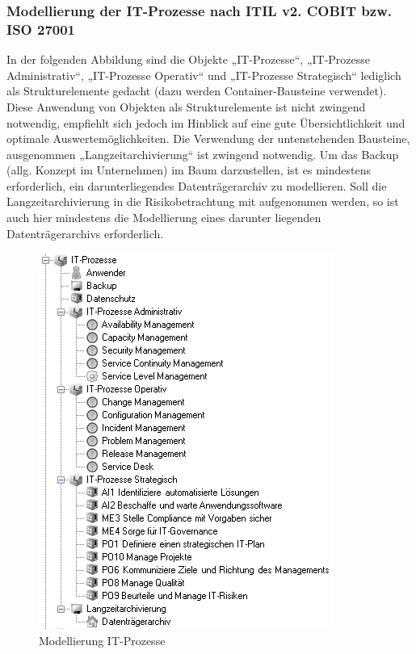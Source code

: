 \subsubsection{Modellierung der IT-Prozesse nach ITIL v2. COBIT bzw. ISO 27001}
In der folgenden Abbildung sind die Objekte „IT-Prozesse“, „IT-Prozesse Administrativ“, „IT-Prozesse Operativ“ und „IT-Prozesse Strategisch“ lediglich als Strukturelemente gedacht (dazu werden Container-Bausteine verwendet). Diese Anwendung von Objekten als Strukturelemente ist nicht zwingend notwendig, empfiehlt sich jedoch im Hinblick auf eine gute Übersichtlichkeit und optimale Auswertemöglichkeiten. Die Verwendung der untenstehenden Bausteine, ausgenommen „Langzeitarchivierung“ ist zwingend notwendig.
Um das Backup (allg. Konzept im Unternehmen) im Baum darzustellen, ist es mindestens erforderlich, ein darunterliegendes Datenträgerarchiv zu modellieren.
Soll die Langzeitarchivierung in die Risikobetrachtung mit aufgenommen werden, so ist auch hier mindestens die Modellierung eines darunter liegenden Datenträgerarchivs erforderlich.
\begin{figure}[htbp]
	\centering
	\includegraphics[scale =1 ]{images/prozesse.png}
	\caption{Modellierung IT-Prozesse}
	\label{fig:bsp}
\end{figure}
